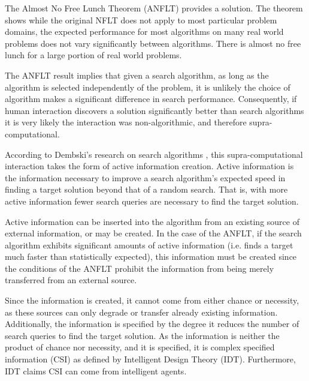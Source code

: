 The Almost No Free Lunch Theorem (ANFLT) \citep{droste02:_optim_with_random_searc_heuris} provides a solution.   The theorem shows while the original NFLT does not apply to most particular problem domains, the expected performance for most algorithms on many real world problems does not vary significantly between algorithms.  There is almost no free lunch for a large portion of real world problems. 

The ANFLT result implies that given a search algorithm, as long as the algorithm is selected independently of the problem, it is unlikely the choice of algorithm  makes a significant difference in search performance.  Consequently, if  human interaction discovers a solution significantly better than search algorithms it is very likely the interaction was non-algorithmic, and therefore supra-computational.

According to Dembski's research on search algorithms \citep{dembski10:_searc_for_searc}, this supra-computational interaction takes the form of active information creation.  Active information is the information necessary to improve a search algorithm's expected speed in finding a target solution beyond that of a random search.  That is, with more active information fewer search queries are necessary to find the target solution.   

Active information can be inserted into the algorithm from an existing source of external information, or may be created.  In the case of the ANFLT, if the search algorithm exhibits significant amounts of active information (i.e. finds a target much faster than statistically expected), this information must be created since the conditions of the ANFLT prohibit the information from being merely transferred from an external source.  

Since the information is created, it cannot come from either chance or necessity, as these sources can only degrade or transfer already existing information.  Additionally, the information is specified by the degree it reduces the number of search queries to find the target solution.  As the information is neither the product of chance nor necessity, and it is specified, it is complex specified information (CSI) \citep{dembski:_specif} as defined by Intelligent Design Theory (IDT).  Furthermore, IDT claims CSI can come from intelligent agents.

